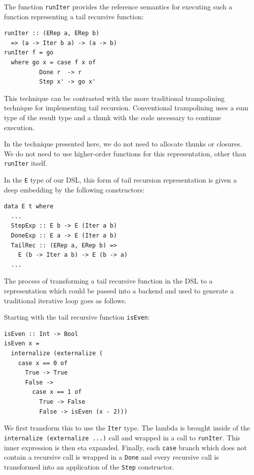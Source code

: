 \documentclass[runningheads, a4paper]{llncs}
\newcommand{\ttt}{\texttt}
\begin{document}
The function \ttt{runIter} provides the reference semantics for executing such a
function representing a tail recursive function:

\begin{lstlisting}
runIter :: (ERep a, ERep b)
  => (a -> Iter b a) -> (a -> b)
runIter f = go
  where go x = case f x of
          Done r  -> r
          Step x' -> go x'
\end{lstlisting}


\noindent This technique can be contrasted with the more traditional trampolining
technique for implementing tail recursion. Conventional trampolining uses a
sum type of the result type and a thunk with the code necessary to continue
execution.~\cite{Ganz:99:Trampolined}

In the technique presented here, we do not need to allocate thunks or closures.
We do not need to use higher-order functions for this representation, other than \ttt{runIter} itself.

In the \ttt{E} type of our DSL, this form of tail recursion representation is
given a deep embedding by the following constructors:

\begin{lstlisting}
data E t where
  ...
  StepExp :: E b -> E (Iter a b)
  DoneExp :: E a -> E (Iter a b)
  TailRec :: (ERep a, ERep b) =>
    E (b -> Iter a b) -> E (b -> a)
  ...
\end{lstlisting}

\noindent The process of transforming a tail recursive function in the DSL to a 
representation which could be passed into a backend and used
to generate a traditional iterative loop goes as follows.

Starting with the tail recursive function  \ttt{isEven}:

\begin{lstlisting}
isEven :: Int -> Bool
isEven x =
  internalize (externalize (
    case x == 0 of
      True -> True
      False ->
        case x == 1 of
          True -> False
          False -> isEven (x - 2)))
\end{lstlisting}


\noindent We first transform this to use the \verb|Iter| type. The lambda is brought
inside of the \ttt{internalize (externalize ...)} call and wrapped in a call to
\ttt{runIter}. This inner expression is then eta expanded. Finally, each \verb|case|
branch which does not contain a recursive call is wrapped in a \verb|Done| and
every recursive call is transformed into an application of the \verb|Step| constructor.
\end{document}
